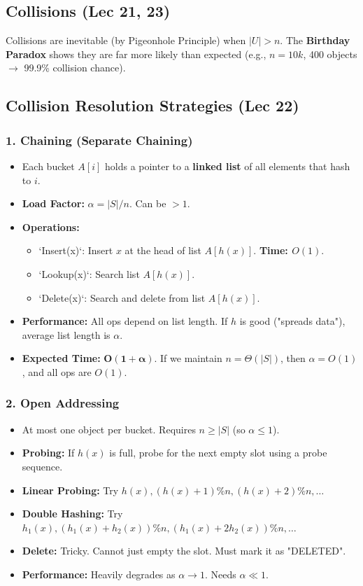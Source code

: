 \subsection{Collisions (Lec 21, 23)}
Collisions are inevitable (by Pigeonhole Principle) when $|U| > n$. The \textbf{Birthday Paradox} shows they are far more likely than expected (e.g., $n=10k$, 400 objects $\to$ 99.9\% collision chance).

\subsection{Collision Resolution Strategies (Lec 22)}

\subsubsection{1. Chaining (Separate Chaining)}
\begin{itemize}
    \item Each bucket $A[i]$ holds a pointer to a \textbf{linked list} of all elements that hash to $i$.
    \item \textbf{Load Factor:} $\alpha = |S| / n$. Can be $> 1$.
    \item \textbf{Operations:}
    \begin{itemize}
        \item `Insert(x)`: Insert $x$ at the head of list $A[h(x)]$. \textbf{Time: $O(1)$}.
        \item `Lookup(x)`: Search list $A[h(x)]$.
        \item `Delete(x)`: Search and delete from list $A[h(x)]$.
    \end{itemize}
    \item \textbf{Performance:} All ops depend on list length. If $h$ is good ("spreads data"), average list length is $\alpha$.
    \item \textbf{Expected Time:} $\mathbf{O(1+\alpha)}$. If we maintain $n = \Theta(|S|)$, then $\alpha=O(1)$, and all ops are \textbf{$O(1)$}.
\end{itemize}

\subsubsection{2. Open Addressing}
\begin{itemize}
    \item At most one object per bucket. Requires $n \ge |S|$ (so $\alpha \le 1$).
    \item \textbf{Probing:} If $h(x)$ is full, probe for the next empty slot using a probe sequence.
    \item \textbf{Linear Probing:} Try $h(x), (h(x)+1)\%n, (h(x)+2)\%n, \dots$
    \item \textbf{Double Hashing:} Try $h_1(x), (h_1(x)+h_2(x))\%n, (h_1(x)+2h_2(x))\%n, \dots$
    \item \textbf{Delete:} Tricky. Cannot just empty the slot. Must mark it as "DELETED".
    \item \textbf{Performance:} Heavily degrades as $\alpha \to 1$. Needs $\alpha \ll 1$.
\end{itemize}


